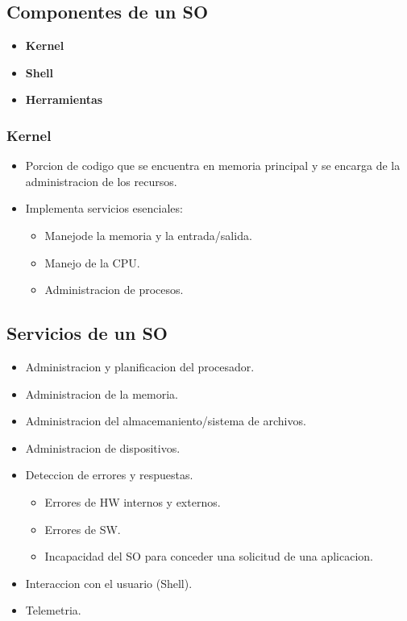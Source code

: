\subsection{Componentes de un SO}
\begin{itemize}
    \item \textbf{Kernel}
    \item \textbf{Shell}
    \item \textbf{Herramientas}
\end{itemize}

\subsubsection{Kernel}
\begin{itemize}
    \item Porcion de codigo que se encuentra en memoria principal y se encarga de la administracion de los recursos.
    \item Implementa servicios esenciales:
        \begin{itemize}
            \item Manejode la memoria y la entrada/salida.
            \item Manejo de la CPU.
            \item Administracion de procesos.
        \end{itemize}
\end{itemize}

\subsection{Servicios de un SO}
\begin{itemize}
    \item Administracion y planificacion del procesador.
    \item Administracion de la memoria.
    \item Administracion del almacemaniento/sistema de archivos.
    \item Administracion de dispositivos.
    \item Deteccion de errores y respuestas.
        \begin{itemize}
            \item Errores de HW internos y externos.
            \item Errores de SW.
            \item Incapacidad del SO para conceder una solicitud de una aplicacion.
        \end{itemize}
        \item Interaccion con el usuario (Shell).
        \item Telemetria.
\end{itemize}
